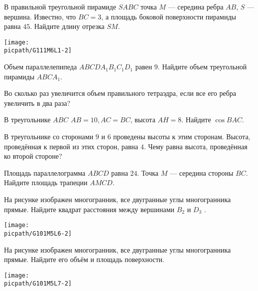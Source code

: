 \begin{class}[number=1]
\begin{listofex}
		\item 
		\begin{minipage}[t]{\bodywidth}
			В правильной треугольной пирамиде \(SABC\) точка \(M\) --- середина ребра \(AB\), \(S\) --- вершина. Известно, что \(BC = 3\), а площадь боковой поверхности пирамиды равна \(45\). Найдите длину отрезка \(SM\).
		\end{minipage}
		\hspace{0.02\linewidth}
		\begin{minipage}[t]{\picwidth}
			\texttt{[image: \\picpath/G111M6L1-2]}
		\end{minipage}
		\item Объем параллелепипеда \(ABCDA_1B_1C_1D_1\) равен \(9\). Найдите объем треугольной пирамиды \(ABCA_1\).
		\item Во сколько раз увеличится объем правильного тетраэдра, если все его ребра увеличить в два раза?
		\item В треугольнике \(ABC\) \(AB = 10, AC = BC\), высота \(AH = 8\). Найдите \(\cos{BAC}\).
		\item В треугольнике со сторонами \(9\) и \(6\) проведены высоты к этим сторонам. Высота, проведённая к первой из этих сторон, равна \(4\). Чему равна высота, проведённая ко второй стороне?
		\item Площадь параллелограмма \(ABCD\) равна \(24\). Точка \(M\) --- середина стороны \(BC\). Найдите площадь трапеции \(AMCD\).
		\item 
		\begin{minipage}[t]{\bodywidth}
			На рисунке изображен многогранник, все двугранные углы многогранника прямые. Найдите квадрат расстояния между вершинами \(B_2\) и \(D_3\) .
		\end{minipage}
		\hspace{0.02\linewidth}
		\begin{minipage}[t]{\picwidth}
			\texttt{[image: \\picpath/G101M5L6-2]}
		\end{minipage}
		\item 
		\begin{minipage}[t]{\bodywidth}
			На рисунке изображен многогранник, все двугранные углы многогранника прямые. Найдите его объём и площадь поверхности.
		\end{minipage}
		\hspace{0.02\linewidth}
		\begin{minipage}[t]{\picwidth}
			\texttt{[image: \\picpath/G101M5L7-2]}
		\end{minipage}
	\end{listofex}
\end{class}


